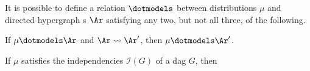 \begin{subappendices}
\begin{theorem}\label{theorem:mrf-bn-monotone-impossible}
    It is possible to define a  relation  $\dotmodels$ 
        between distributions $\mu$ and directed hypergraph s $\Ar$
    satisfying 
    any two, but not all three, of the
    following.
    \begin{description}[itemsep=0pt,parsep=0.3ex,topsep=0pt]
        \item [\rm(monotonicity)]
            If $\mu \dotmodels \Ar$
            and $\Ar \rightsquigarrow \Ar'$,
            then
            $\mu \dotmodels \Ar'$.
        \item [\rm(positive BN capture)]
            If $\mu$ satisfies the independencies
            $\mathcal I(G)$ of a dag $G$,
            then

\end{description}
\end{theorem}
\end{subappendices}
